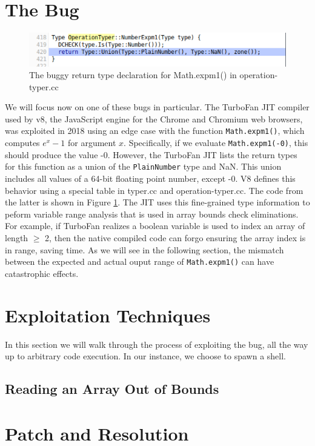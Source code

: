\documentclass[11pt]{article}
\begin{document}
\section{The Bug}
\begin{figure}
	\includegraphics[width=\linewidth]{typer.png}
	\caption{The buggy return type declaration for Math.expm1() in operation-typer.cc}
  \label{fig:typer}
\end{figure}	
We will focus now on one of these bugs in particular. The TurboFan JIT compiler used by v8, the
JavaScript engine for the Chrome and Chromium web browsers, was exploited in 2018 using an edge case
with the function \texttt{Math.expm1()}, which computes $e^x -1$ for argument $x$.  Specifically, if
we evaluate \texttt{Math.expm1(-0)}, this should produce the value -0.  However, the TurboFan JIT
lists the return types for this function as a union of the \texttt{PlainNumber} type and NaN. This
union includes all values of a 64-bit floating point number, except -0. V8 defines this behavior
using a special table in typer.cc and operation-typer.cc. The code from the latter is shown in
Figure \ref{fig:typer}. The JIT uses this fine-grained type information to peform variable range
analysis that is used in array bounds check eliminations. For example, if TurboFan realizes a
boolean variable is used to index an array of length $\geq$ 2, then the native compiled code can
forgo ensuring the array index is in range, saving time. As we will see in the following section,
the mismatch between the expected and actual ouput range of \texttt{Math.expm1()} can have
catastrophic effects.

\section{Exploitation Techniques}
In this section we will walk through the process of exploiting the bug, all the way up to arbitrary
code execution. In our instance, we choose to spawn a shell.

\subsection{Reading an Array Out of Bounds}

\section{Patch and Resolution} 
\end{document}
